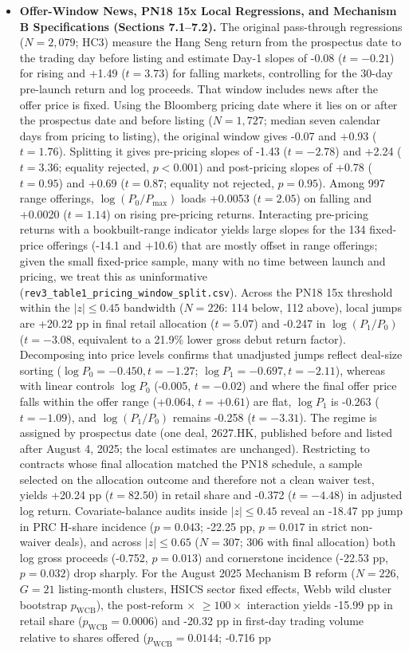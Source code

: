 \documentclass[11pt,letterpaper]{article}
\begin{document}
\begin{itemize}
\item \textbf{Offer-Window News, PN18 15x Local Regressions, and Mechanism B Specifications (Sections 7.1–7.2).} The original pass-through regressions ($N = 2,079$; HC3) measure the Hang Seng return from the prospectus date to the trading day before listing and estimate Day-1 slopes of -0.08 ($t = -0.21$) for rising and +1.49 ($t = 3.73$) for falling markets, controlling for the 30-day pre-launch return and log proceeds. That window includes news after the offer price is fixed. Using the Bloomberg pricing date where it lies on or after the prospectus date and before listing ($N = 1,727$; median seven calendar days from pricing to listing), the original window gives -0.07 and +0.93 ($t = 1.76$). Splitting it gives pre-pricing slopes of -1.43 ($t = -2.78$) and +2.24 ($t = 3.36$; equality rejected, $p < 0.001$) and post-pricing slopes of +0.78 ($t = 0.95$) and +0.69 ($t = 0.87$; equality not rejected, $p = 0.95$). Among 997 range offerings, $\log(P_0/P_{\max})$ loads +0.0053 ($t = 2.05$) on falling and +0.0020 ($t = 1.14$) on rising pre-pricing returns. Interacting pre-pricing returns with a bookbuilt-range indicator yields large slopes for the 134 fixed-price offerings (-14.1 and +10.6) that are mostly offset in range offerings; given the small fixed-price sample, many with no time between launch and pricing, we treat this as uninformative (\texttt{\small rev3\_\allowbreak{}table1\_\allowbreak{}pricing\_\allowbreak{}window\_\allowbreak{}split.csv}). Across the PN18 15x threshold within the $|z| \le 0.45$ bandwidth ($N = 226$: 114 below, 112 above), local jumps are +20.22 pp in final retail allocation ($t = 5.07$) and -0.247 in $\log(P_1/P_0)$ ($t = -3.08$, equivalent to a 21.9\% lower gross debut return factor). Decomposing into price levels confirms that unadjusted jumps reflect deal-size sorting ($\log P_0 = -0.450, t = -1.27$; $\log P_1 = -0.697, t = -2.11$), whereas with linear controls $\log P_0$ (-0.005, $t = -0.02$) and where the final offer price falls within the offer range (+0.064, $t = +0.61$) are flat, $\log P_1$ is -0.263 ($t = -1.09$), and $\log(P_1/P_0)$ remains -0.258 ($t = -3.31$). The regime is assigned by prospectus date (one deal, 2627.HK, published before and listed after August 4, 2025; the local estimates are unchanged). Restricting to contracts whose final allocation matched the PN18 schedule, a sample selected on the allocation outcome and therefore not a clean waiver test, yields +20.24 pp ($t = 82.50$) in retail share and -0.372 ($t = -4.48$) in adjusted log return. Covariate-balance audits inside $|z| \le 0.45$ reveal an -18.47 pp jump in PRC H-share incidence ($p = 0.043$; -22.25 pp, $p = 0.017$ in strict non-waiver deals), and across $|z| \le 0.65$ ($N = 307$; 306 with final allocation) both log gross proceeds (-0.752, $p = 0.013$) and cornerstone incidence (-22.53 pp, $p = 0.032$) drop sharply. For the August 2025 Mechanism B reform ($N = 226$, $G = 21$ listing-month clusters, HSICS sector fixed effects, Webb wild cluster bootstrap $p_{\text{WCB}}$), the post-reform $\times$ $\ge 100\times$ interaction yields -15.99 pp in retail share ($p_{\text{WCB}} = 0.0006$) and -20.32 pp in first-day trading volume relative to shares offered ($p_{\text{WCB}} = 0.0144$; -0.716 pp 
\end{itemize}
\end{document}
